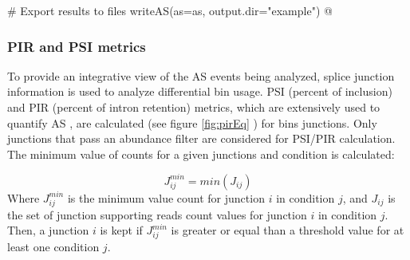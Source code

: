 \documentclass{article}
\begin{document}
# Export results to files
writeAS(as=as, output.dir="example")
@

\subsubsection{ PIR and PSI metrics } \label{sec:psir}
To provide an integrative view of the AS events being analyzed, splice junction
information is used to analyze differential bin usage. PSI (percent of
inclusion) and PIR (percent of intron retention) metrics, which are extensively
used to quantify AS \cite{pmid21057496}, are calculated (see figure
\ref{fig:pirEq} ) for bins junctions. Only junctions that pass an abundance
filter are considered for PSI/PIR calculation. The minimum value of
counts for a given junctions and condition is calculated:

\begin{equation}
  J^{min}_{ij} = min( J_{ij} )
\end{equation}
Where $J^{min}_{ij}$ is the minimum value count for junction $i$ in condition
$j$, and $J_{ij}$ is the set of junction supporting reads count values for
junction $i$ in condition $j$. Then, a junction $i$ is kept if $J^{min}_{ij}$ is 
greater or equal than a threshold value for at least one condition $j$.
\end{document}
